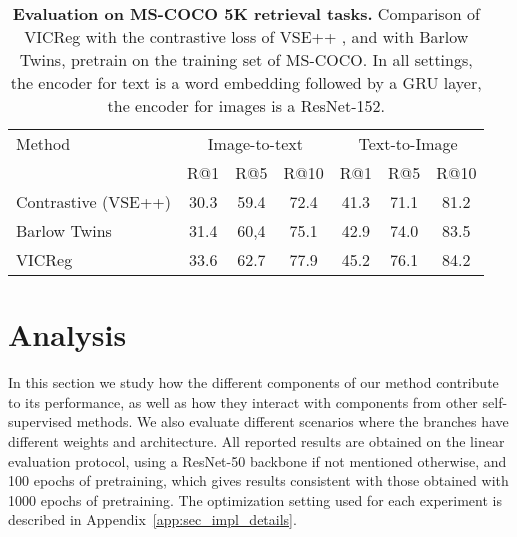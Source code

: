 \documentclass{article}
\begin{document}
\begin{table}[t]
\caption{\textbf{Evaluation on MS-COCO 5K retrieval tasks.} Comparison of VICReg with the contrastive loss of VSE++ \cite{faghri2018vse}, and with Barlow Twins, pretrain on the training set of MS-COCO. In all settings, the encoder for text is a word embedding followed by a GRU layer, the encoder for images is a ResNet-152.}
\label{tab:retrieval}
\vspace{-1.5em}
\setlength{\tabcolsep}{10.5pt}
\vskip 0.15in
\begin{center}
\begin{tabular}{lcccccc}
\toprule
Method & \multicolumn{3}{c}{Image-to-text} &  \multicolumn{3}{c}{Text-to-Image} \\
                & R@1 & R@5 & R@10 & R@1 & R@5 & R@10 \\
\midrule
Contrastive (VSE++) &	30.3	& 59.4 &72.4	&41.3&	71.1&	81.2 \\
Barlow Twins	&31.4	&60,4	&75.1&	42.9	&74.0&	83.5 \\
VICReg	&33.6&	62.7&	77.9	&45.2&	76.1&	84.2 \\
\bottomrule
\end{tabular}
\end{center}
\vspace{-2mm}
\end{table}


\section{Analysis} \label{sec:ablations}
In this section we study how the different components of our method contribute to its performance, as well as how they interact with components from other self-supervised methods. We also evaluate different scenarios where the branches have different weights and architecture. All reported results are obtained on the linear evaluation protocol, using a ResNet-50 backbone if not mentioned otherwise, and 100 epochs of pretraining, which gives results consistent with those obtained with 1000 epochs of pretraining. The optimization setting used for each experiment is described in Appendix~\ref{app:sec_impl_details}.
\end{document}
